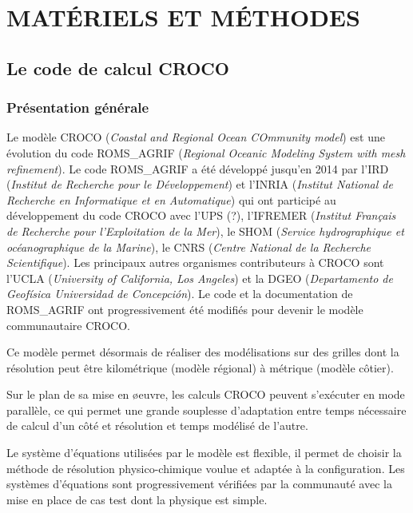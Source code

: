 \documentclass[10pt,a4paper,titlepage]{article}
\begin{document}
\newpage

\section{MATÉRIELS ET MÉTHODES}
\label{sec:materiel_methodes}
\subsection{Le code de calcul CROCO}
\label{sub:croco}

\subsubsection{Présentation générale}
\label{subsub:presentation_generale}
Le modèle CROCO (\textit{Coastal and Regional Ocean COmmunity model}) est une évolution du code ROMS\_AGRIF (\textit{Regional Oceanic Modeling System with mesh refinement}).
Le code ROMS\_AGRIF a été développé jusqu'en 2014 par l'IRD (\textit{Institut de Recherche pour le Développement}) et l'INRIA (\textit{Institut National de Recherche en Informatique et en Automatique}) qui ont participé au développement du code CROCO avec
l'UPS (?),
l'IFREMER (\textit{Institut Français de Recherche pour l'Exploitation de la Mer}),
le SHOM (\textit{Service hydrographique et océanographique de la Marine}),
le CNRS (\textit{Centre National de la Recherche Scientifique}). Les principaux autres organismes contributeurs à CROCO sont
l'UCLA (\textit{University of California, Los Angeles})
et la DGEO (\textit{Departamento de Geofísica Universidad de Concepción}).
Le code et la documentation de ROMS\_AGRIF ont progressivement été modifiés pour devenir le modèle communautaire CROCO.

Ce modèle permet désormais de réaliser des modélisations sur des grilles dont la résolution peut être kilométrique (modèle régional) à métrique (modèle côtier).

Sur le plan de sa mise en \o{}euvre, les calculs CROCO peuvent s’exécuter en mode parallèle, ce qui permet une grande souplesse d'adaptation entre temps nécessaire de calcul d'un côté et résolution et temps modélisé de l'autre.

Le système d'équations utilisées par le modèle est flexible, il permet de choisir la méthode de résolution physico-chimique voulue et adaptée à la configuration.
Les systèmes d'équations sont progressivement vérifiées par la communauté avec la mise en place de cas test dont la physique est simple. %
\end{document}
